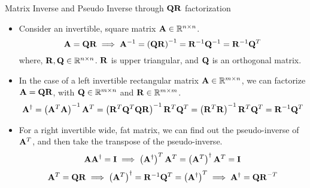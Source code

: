 \documentclass[aspectratio=169]{beamer}
\def\mf{\ensuremath\mathbf}
\def\mb{\ensuremath\mathbb}
\begin{document}
\begin{frame}[t]{Matrix Inverse and Pseudo Inverse through $\mf{QR}$ factorization}
\begin{itemize}
    \item Consider an invertible, square matrix $\mf{A} \in \mb{R}^{n \times n}$. 
    \[ \mf{A} = \mf{QR} \implies \mf{A}^{-1} = \left(\mf{QR}\right)^{-1} = \mf{R}^{-1}\mf{Q}^{-1} = \mf{R}^{-1}\mf{Q}^T \] 
    where, $\mf{R}, \mf{Q} \in \mb{R}^{n \times n}$. $\mf{R}$ is upper triangular, and $\mf{Q}$ is an orthogonal matrix.
    
    \item In the case of a left invertible rectangular matrix $\mf{A} \in \mb{R}^{m \times n}$, we can factorize $\mf{A} = \mf{QR}$, with $\mf{Q} \in \mb{R}^{m \times n}$ and $\mf{R} \in \mb{R}^{m \times m}$.
    \[ \mf{A}^{\dagger} = \left(\mf{A}^T\mf{A}\right)^{-1}\mf{A}^T = \left(\mf{R}^T\mf{Q}^T\mf{QR}\right)^{-1}\mf{R}^T\mf{Q}^T = \left(\mf{R}^T\mf{R}\right)^{-1}\mf{R}^T\mf{Q}^T = \mf{R}^{-1}\mf{Q}^T \]
    
    \item For a right invertible wide, fat matrix, we can find out the pseudo-inverse of $\mf{A}^T$, and then take the transpose of the pseudo-inverse.
    \[ \mf{AA}^{\dagger} = \mf{I} \implies \left(\mf{A}^{\dagger}\right)^T\mf{A}^T = \left(\mf{A}^T\right)^{\dagger}\mf{A}^T = \mf{I} \]
    \[ \mf{A}^T = \mf{QR} \implies \left(\mf{A}^T\right)^{\dagger} = \mf{R}^{-1}\mf{Q}^T = \left(\mf{A}^{\dagger}\right)^T \implies  \mf{A}^{\dagger} = \mf{QR}^{-T} \]
\end{itemize}
\end{frame}
\end{document}
